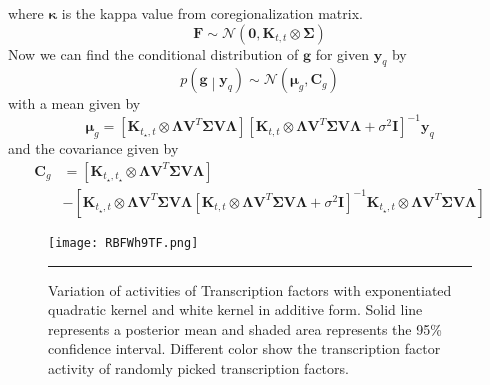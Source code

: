 where $\boldsymbol{\kappa}$ is the kappa value from coregionalization matrix.
\begin{equation} \label{eq:predictionF}
  \mathbf{F}  \sim \mathcal{N} \left( \mathbf{0},\mathbf{K}_{t,t} \otimes \boldsymbol{\Sigma}\right)
\end{equation}
Now we can find the conditional distribution of $\mathbf{g}$ for given $\mathbf{y}_q$ by
\begin{equation}\label{eq:gGivenYq}
 p\left(\mathbf{g} \middle| \mathbf{y}_q\right) \sim 
    \mathcal{N} \left( \boldsymbol{\mu}_g, \mathbf{C}_g\right)
\end{equation}
with a mean given by
\begin{equation} \label{eq:prediction_MuG}
  \boldsymbol{\mu}_g = 
    \left[ \mathbf{K}_{t_\star,t} \otimes \boldsymbol{\Lambda} \mathbf{V}^T\boldsymbol{\Sigma} \mathbf{V} \boldsymbol{\Lambda}  \right] 
    \left[ \mathbf{K}_{t,t} \otimes \boldsymbol{\Lambda} \mathbf{V}^T\boldsymbol{\Sigma} \mathbf{V} \boldsymbol{\Lambda} + \sigma^2 \mathbf{I} \right]^{-1}\mathbf{y}_q
\end{equation}
and the covariance given by
\begin{equation} \label{eq:prediction_Cg}
\begin{split}
\boldsymbol{C}_g &= 
    \left[ \mathbf{K}_{t_\star,t_\star} \otimes \boldsymbol{\Lambda} \mathbf{V}^T\boldsymbol{\Sigma} \mathbf{V} \boldsymbol{\Lambda}  \right] \\
    & -\left[ \mathbf{K}_{t_\star,t} \otimes \boldsymbol{\Lambda} \mathbf{V}^T\boldsymbol{\Sigma} \mathbf{V} \boldsymbol{\Lambda}  
    \left[ \mathbf{K}_{t,t} \otimes \boldsymbol{\Lambda} \mathbf{V}^T\boldsymbol{\Sigma} \mathbf{V} \boldsymbol{\Lambda} + \sigma^2 \mathbf{I} \right]^{-1} 
    \mathbf{K}_{t_\star,t} \otimes \boldsymbol{\Lambda} \mathbf{V}^T\boldsymbol{\Sigma} \mathbf{V} \boldsymbol{\Lambda} \right]
\end{split}
\end{equation}
\begin{figure}[t]
	\centering
		\texttt{[image: RBFWh9TF.png]}
		\rule{35em}{0.5pt}
	\caption[Variation of activities of transcription factors with exponentiated quadratic kernel and  white kernel in additive form] {Variation of activities of Transcription factors with exponentiated quadratic kernel and  white kernel in additive form. Solid line represents a posterior mean and shaded area represents the 95\% confidence interval. Different color show the transcription factor activity of randomly picked transcription factors.}
	\label{fig:TFA_with_RBFnWhKernel}
\end{figure}
